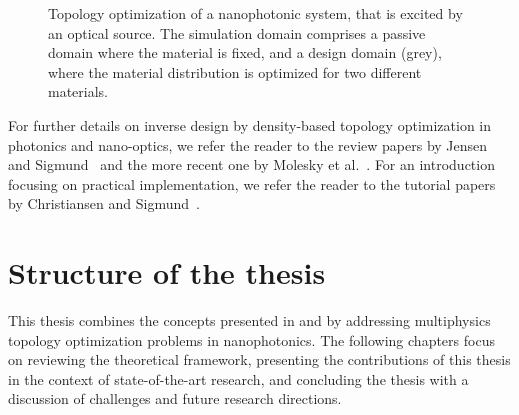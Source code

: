 \begin{figure}[tb]
    \centering
    \caption{Topology optimization of a nanophotonic system, that is excited by an optical source. The simulation domain comprises a passive domain where the material is fixed, and a design domain (grey), where the material distribution is optimized for two different materials.}
        \label{fig:top_opt}
\end{figure}

For further details on inverse design by density-based topology optimization in photonics and nano-optics, we refer the reader to
the review papers by Jensen and Sigmund~\cite{jensen_review} and the more recent one by Molesky et al.~\cite{Molesky_2018}. 
For an introduction focusing on practical implementation, we refer the reader to the tutorial papers by Christiansen and Sigmund~\cite{tutorial_matlab, tutorial_COMSOL}.

\section{Structure of the thesis}

This thesis combines the concepts presented in  and  by addressing multiphysics topology optimization problems in nanophotonics. The following chapters focus on reviewing
 the theoretical framework, presenting the contributions of this thesis in the context of state-of-the-art research,
  and concluding the thesis with a discussion of challenges and future research directions.


